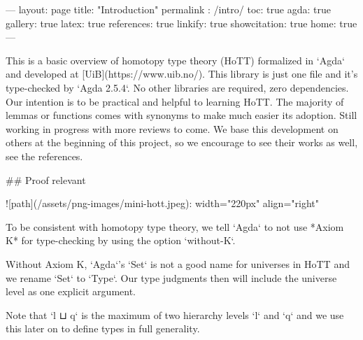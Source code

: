---
layout: page
title: "Introduction"
permalink : /intro/
toc: true
agda: true
gallery: true
latex: true
references: true
linkify: true
showcitation: true
home: true
---

This is a basic overview of homotopy type theory (HoTT) formalized in `Agda` and
developed at [UiB](https://www.uib.no/). This library is just one file and it's
type-checked by `Agda 2.5.4`.  No other libraries are required, zero
dependencies. Our intention is to be practical and helpful to learning HoTT. The
majority of lemmas or functions comes with synonyms to make much easier its
adoption. Still working in progress with more reviews to come. We base this
development on others at the beginning of this project, so we encourage to see
their works as well, see the references.

## Proof relevant

![path](/assets/png-images/mini-hott.jpeg){: width="220px" align="right" }

To be consistent with homotopy type theory, we tell `Agda` to not use *Axiom K*
for type-checking by using the option `without-K`.

\begin{code}%
\>[0]\AgdaSymbol{\{-\#}\AgdaSpace{}%
\AgdaSpace{}%
\AgdaSpace{}%
\AgdaSymbol{\#-\}}\<%
\end{code}

Without Axiom K, `Agda`'s `Set` is not a good name for universes in HoTT and we
rename `Set` to `Type`. Our type judgments then will include the universe level
as one explicit argument.

\begin{code}%
\>[0]\AgdaSpace{}%
\AgdaSpace{}%
\AgdaSpace{}%
\AgdaSpace{}%
\AgdaSymbol{(}\AgdaSpace{}%
\AgdaSpace{}%
\AgdaSymbol{;}\AgdaSpace{}%
\AgdaSymbol{;}\AgdaSpace{}%
\AgdaSymbol{;}\AgdaSpace{}%
\AgdaSpace{}%
\AgdaSymbol{)}\AgdaSpace{}%
\<%
\end{code}

Note that `l ⊔ q` is the maximum of two hierarchy levels `l` and `q` and we
use this later on to define types in full generality.

\begin{code}%
\>[0]\AgdaSpace{}%
\AgdaSymbol{:}\AgdaSpace{}%
\AgdaSymbol{(}\AgdaSpace{}%
\AgdaSymbol{:}\AgdaSpace{}%
\AgdaSymbol{)}\AgdaSpace{}%
\AgdaSpace{}%
\AgdaSpace{}%
\AgdaSymbol{(}\AgdaSpace{}%
\AgdaSymbol{)}\<%
\\
\>[0]\AgdaSpace{}%
\AgdaSpace{}%
\AgdaSymbol{=}\AgdaSpace{}%
\AgdaSpace{}%
\<%
\end{code}


